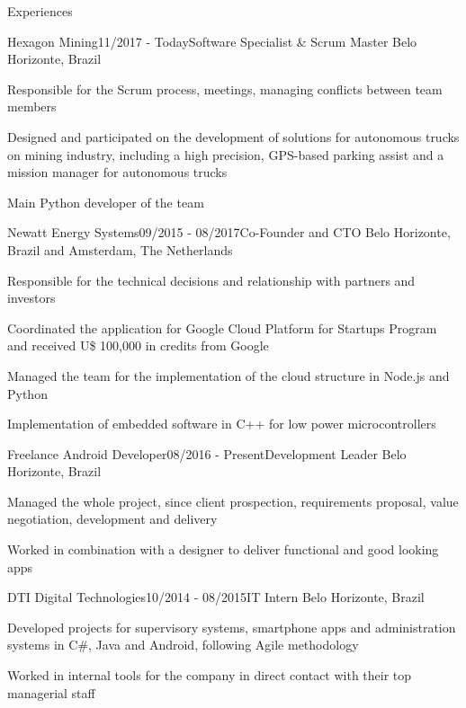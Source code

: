 \documentclass[14pt, a4paper]{resume} %
\begin{document}
\begin{rSection}{Experiences}


\begin{rSubsection}{Hexagon Mining}{11/2017 - Today}{\normalfont Software Specialist \& Scrum Master}{ \normalfont Belo Horizonte, Brazil}
 	\item Responsible for the Scrum process, meetings, managing conflicts between team members
 	\item Designed and participated on the development of solutions for autonomous trucks on mining industry, including a high precision, GPS-based parking assist and a mission manager for autonomous trucks
 	\item Main Python developer of the team
 	
	
\end{rSubsection}

\begin{rSubsection}{Newatt Energy Systems}{09/2015 - 08/2017}{\normalfont Co-Founder and CTO}{ \normalfont Belo Horizonte, Brazil and Amsterdam, The Netherlands}
 	\item Responsible for the technical decisions and relationship with partners and investors
 	\item Coordinated the application for Google Cloud Platform for Startups Program and received U\$ 100,000 in credits from Google
 	\item Managed the team for the implementation of the cloud structure in Node.js and Python
 	\item Implementation of embedded software in C++ for low power microcontrollers
	
\end{rSubsection}


\begin{rSubsection}{Freelance Android Developer}{08/2016 - Present}{\normalfont Development Leader}{ \normalfont Belo Horizonte, Brazil}
 	\item Managed the whole project, since client prospection, requirements proposal, value negotiation, development and delivery
 	\item Worked in combination with a designer to deliver functional and good looking apps
\end{rSubsection}

\begin{rSubsection}{DTI Digital Technologies}{10/2014 - 08/2015}{\normalfont IT Intern}{ \normalfont Belo Horizonte, Brazil}
 	\item Developed projects for supervisory systems, smartphone apps and administration systems in C$\#$, Java and Android, following Agile methodology
 	\item Worked in internal tools for the company in direct contact with their top managerial staff
\end{rSubsection}


\end{rSection}
\end{document}
